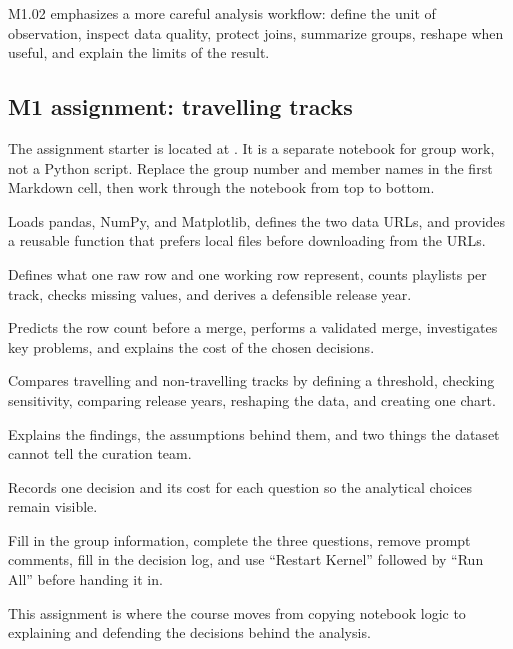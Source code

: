 \documentclass[11pt,a4paper]{article}
\begin{document}
M1.02 emphasizes a more careful analysis workflow: define the unit of observation, inspect data quality, protect joins, summarize groups, reshape when useful, and explain the limits of the result.

\subsection{M1 assignment: travelling tracks}

The assignment starter is located at . It is a separate notebook for group work, not a Python script. Replace the group number and member names in the first Markdown cell, then work through the notebook from top to bottom.

\begin{description}[leftmargin=3.2cm,style=multiline]
    \item[Setup cell] Loads pandas, NumPy, and Matplotlib, defines the two data URLs, and provides a reusable function that prefers local files before downloading from the URLs.
    \item[Question 1] Defines what one raw row and one working row represent, counts playlists per track, checks missing values, and derives a defensible release year.
    \item[Question 2] Predicts the row count before a merge, performs a validated merge, investigates key problems, and explains the cost of the chosen decisions.
    \item[Question 3] Compares travelling and non-travelling tracks by defining a threshold, checking sensitivity, comparing release years, reshaping the data, and creating one chart.
    \item[Interpretation] Explains the findings, the assumptions behind them, and two things the dataset cannot tell the curation team.
    \item[Decision log] Records one decision and its cost for each question so the analytical choices remain visible.
    \item[Submission check] Fill in the group information, complete the three questions, remove prompt comments, fill in the decision log, and use ``Restart Kernel'' followed by ``Run All'' before handing it in.
\end{description}

This assignment is where the course moves from copying notebook logic to explaining and defending the decisions behind the analysis.
\end{document}
